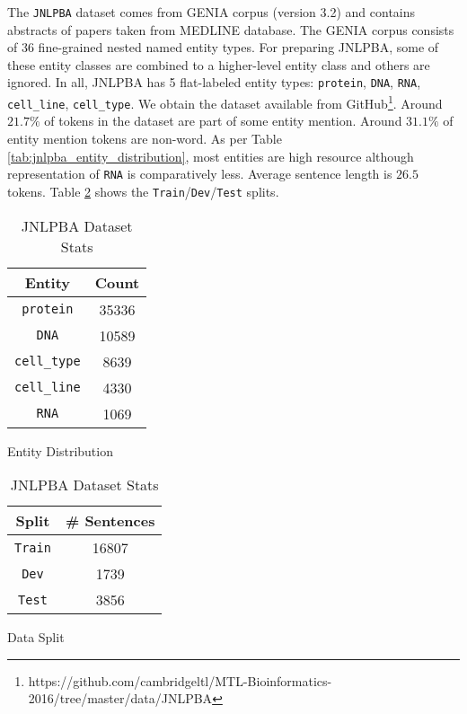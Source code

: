 The \texttt{JNLPBA}\cite{kim2004introduction} dataset comes from GENIA\cite{kim2003genia} corpus (version 3.2) and contains abstracts of papers taken from MEDLINE database. The GENIA corpus consists of 36 fine-grained nested named entity types. For preparing JNLPBA, some of these entity classes are combined to a higher-level entity class and others are ignored. In all, JNLPBA has 5 flat-labeled entity types: \texttt{protein}, \texttt{DNA}, \texttt{RNA}, \texttt{cell\_line}, \texttt{cell\_type}. We obtain the dataset available from GitHub\footnote{https://github.com/cambridgeltl/MTL-Bioinformatics-2016/tree/master/data/JNLPBA}. Around $21.7\%$ of tokens in the dataset are part of some entity mention. Around $31.1\%$ of entity mention tokens are non-word. As per Table \ref{tab:jnlpba_entity_distribution}, most entities are high resource although representation of \texttt{RNA} is comparatively less. Average sentence length is $26.5$ tokens. Table \ref{tab:jnlpba_dataset_split} shows the \texttt{Train}/\texttt{Dev}/\texttt{Test} splits. 

\begin{table}[h!]
\begin{subtable}[t]{.48\linewidth}
\centering
\begin{tabular}{|c|c|}\hline
	\textbf{Entity} & \textbf{Count}\\\hline
	\texttt{protein} & 35336\\\hline
    \texttt{DNA} & 10589\\\hline
    \texttt{cell\_type} & 8639\\\hline
    \texttt{cell\_line} & 4330\\\hline
    \texttt{RNA} & 1069\\\hline
	\end{tabular}
	\caption{Entity Distribution}
	\label{tab:jnlpba_entity_distribution}
\end{subtable}
\begin{subtable}[t]{.48\linewidth}
\centering
\begin{tabular}{|c|c|}\hline
	\textbf{Split} & \textbf{\# Sentences}\\\hline
	\texttt{Train} & 16807\\\hline
	\texttt{Dev} & 1739\\\hline
	\texttt{Test} & 3856\\\hline
	\end{tabular}
	\caption{Data Split}
	\label{tab:jnlpba_dataset_split}
\end{subtable}
\caption{JNLPBA Dataset Stats}
\end{table}

